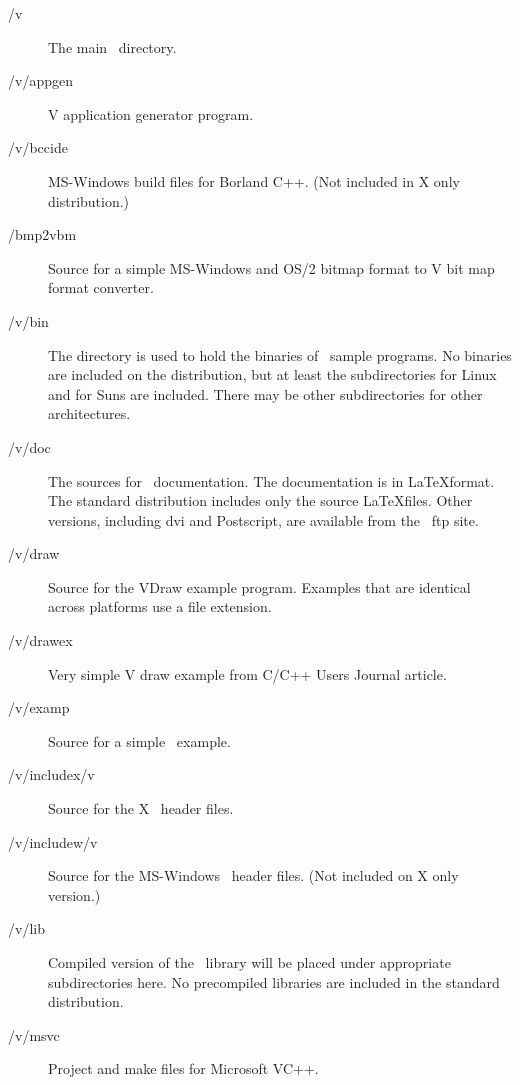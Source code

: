 \begin{description}
\item[/v] The main \V\ directory.

\item[/v/appgen] V application generator program.

\item[/v/bccide] MS-Windows build files for Borland C++. (Not included
in X only distribution.)

\item[/bmp2vbm] Source for a simple MS-Windows and OS/2  bitmap
format to  V bit map format converter.

\item[/v/bin] The  directory is used to hold the binaries
of \V\ sample programs. No binaries are included on the distribution,
but at least the subdirectories  for Linux and  for
Suns are included. There may be other subdirectories for other architectures.

\item[/v/doc] The sources for \V\ documentation. The documentation
is in \LaTeX format. The standard distribution includes only the source
\LaTeX files. Other versions, including dvi and Postscript, are available from
the \V\ ftp site.

\item[/v/draw] Source for the VDraw example program. Examples that
are identical across platforms use a  file extension.

\item[/v/drawex] Very simple V draw example from C/C++ Users Journal
article.

\item[/v/examp] Source for a simple \V\ example.

\item[/v/includex/v] Source for the X  \V\ header files.

\item[/v/includew/v] Source for the MS-Windows  \V\ header files.
(Not included on X only version.)

\item[/v/lib] Compiled version of the \V\ library will be placed
under appropriate subdirectories here. No precompiled libraries are
included in the standard distribution.

\item[/v/msvc] Project and make files for Microsoft VC++.


\end{description}
